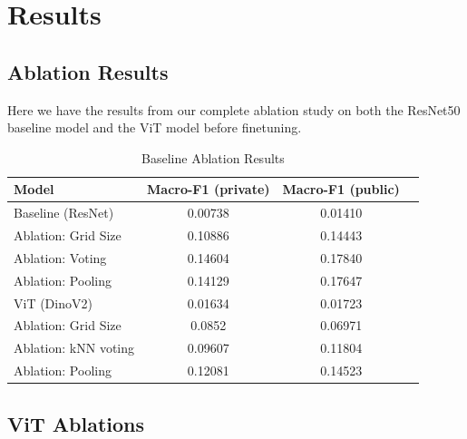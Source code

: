 \documentclass[conference]{IEEEtran}
\begin{document}
\section{Results}

\subsection{Ablation Results}

Here we have the results from our complete ablation study on both the ResNet50 baseline model and the ViT model before finetuning.

\begin{table}[H]
      \caption{Baseline Ablation Results}
        \label{tab:ablation}

      \begin{tabular}{lccc}
        \toprule
        \textbf{Model} & \textbf{Macro-F1 (private)} & \textbf{Macro-F1 (public)}\\
        \midrule
        Baseline (ResNet)  & 0.00738 & 0.01410 \\
        \-\hspace{0.2cm} Ablation: Grid Size & 0.10886 & 0.14443 \\
        \-\hspace{0.2cm} Ablation: Voting & 0.14604 & 0.17840 \\
        \-\hspace{0.2cm} Ablation: Pooling & 0.14129 & 0.17647 \\
        ViT (DinoV2)  & 0.01634 & 0.01723 \\
        \-\hspace{0.2cm} Ablation: Grid Size & 0.0852 & 0.06971 \\
        \-\hspace{0.2cm} Ablation: kNN voting & 0.09607 & 0.11804 \\
        \-\hspace{0.2cm} Ablation: Pooling & 0.12081 & 0.14523 \\
        \bottomrule
      \end{tabular}
    \end{table}

\subsection{ViT Ablations}
\end{document}
